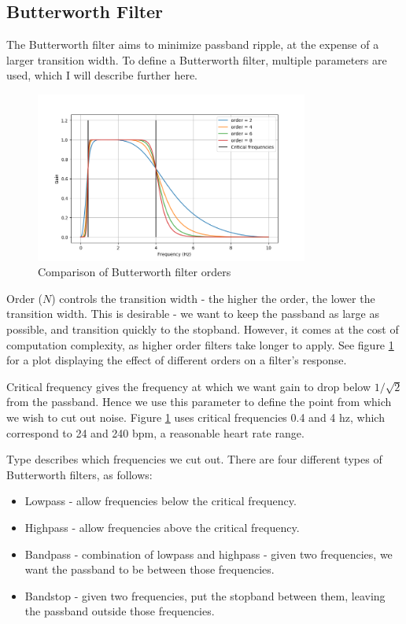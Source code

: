 \documentclass[12pt,a4paper,twoside,openright]{report}
\begin{document}
\subsection{Butterworth Filter}

The Butterworth filter aims to minimize passband ripple, at the expense of a
larger transition width. To define a Butterworth filter, multiple parameters
are used, which I will describe further here.

\begin{figure}[h]
	\centerline{\includegraphics[width=0.8\textwidth]{figs/butter-order-comparison.png}}
\caption{Comparison of Butterworth filter orders}
\label{fig:butterworth-order}
\end{figure}

Order (\(N\)) controls the transition width - the higher the order, the lower
the transition width. This is desirable - we want to keep the passband as
large as possible, and transition quickly to the stopband. However, it comes
at the cost of computation complexity, as higher order filters take longer to
apply. See figure \ref{fig:butterworth-order} for a plot displaying the effect
of different orders on a filter's response.

Critical frequency gives the frequency at which we want gain to drop below
\(1/\sqrt2\) from the passband. Hence we use this parameter to define the
point from which we wish to cut out noise. Figure \ref{fig:butterworth-order}
uses critical frequencies 0.4 and 4 hz, which correspond to 24 and 240 bpm, a
reasonable heart rate range.

Type describes which frequencies we cut out. There are four different
types of Butterworth filters, as follows:

\begin{itemize}
	\item Lowpass - allow frequencies below the critical frequency.

	\item Highpass - allow frequencies above the critical frequency.

	\item Bandpass - combination of lowpass and highpass - given two
		frequencies, we want the passband to be between those
		frequencies.

	\item Bandstop - given two frequencies, put the stopband between them,
		leaving the passband outside those frequencies.
\end{itemize}
\end{document}
